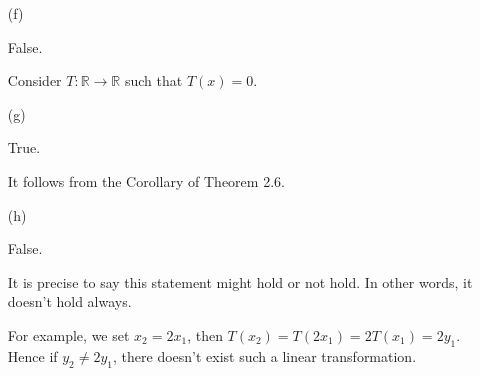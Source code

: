 \begin{Exercise}
\begin{enumerate}[(a)]
\item[(f)]
\begin{answer}
False.
\end{answer}
\begin{solution}
Consider $T:\mathbb{R}\to\mathbb{R}$ such that $T(x) = 0$.
\end{solution}

\item[(g)]
\begin{answer}
True.
\end{answer}
\begin{solution}
It follows from the Corollary of Theorem 2.6.
\end{solution}

\item[(h)]
\begin{answer}
False.
\end{answer}
\begin{solution}
It is precise to say this statement might hold or not hold. In other words, it doesn't hold always.

For example, we set $x_2 = 2x_1$, then $T(x_2) = T(2 x_1) = 2T(x_1) = 2 y_1$. Hence if $y_2\neq 2 y_1$, there doesn't exist such a linear transformation.
\end{solution}
\end{enumerate}
\end{Exercise}